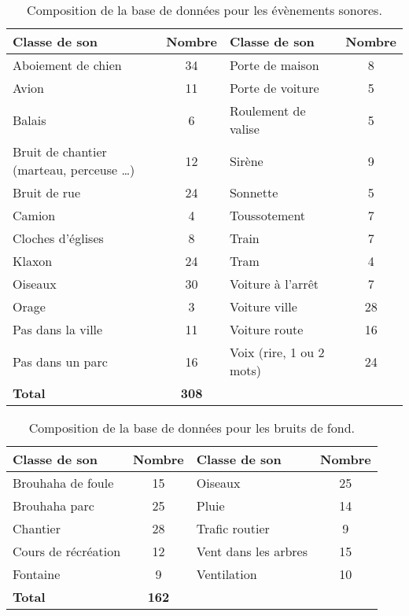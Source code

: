 \begin{table}[h]
\caption{Composition de la base de données pour les évènements sonores.}
\centering
\begin{tabular}{m{5cm} c |m{5cm} c}
\hline
\toprule
\textbf{Classe de son} & \textbf{Nombre} & \textbf{Classe de son} & \textbf{Nombre} \\
\midrule
Aboiement de chien & 34 & Porte de maison & 8\\ 
\rowcolor[HTML]{C0C0C0}
Avion & 11 &  Porte de voiture & 5\\ 
Balais & 6 & Roulement de valise & 5\\ 
\rowcolor[HTML]{C0C0C0}
Bruit de chantier (marteau, perceuse \dots) & 12 &  Sirène & 9 \\ 
Bruit de rue & 24 & Sonnette & 5\\ 
\rowcolor[HTML]{C0C0C0}
Camion & 4 & Toussotement & 7 \\ 
Cloches d'églises & 8 & Train & 7\\
\rowcolor[HTML]{C0C0C0}
Klaxon & 24 &  Tram & 4 \\ 
Oiseaux & 30 &  Voiture à l'arrêt & 7\\ 
\rowcolor[HTML]{C0C0C0}
Orage & 3 &  Voiture ville & 28\\ 
Pas dans la ville & 11 & Voiture route & 16 \\
\rowcolor[HTML]{C0C0C0}
Pas dans un parc & 16 &  Voix (rire, 1 ou 2 mots) & 24 \\ 
\textbf{Total} & \textbf{308}\\
\bottomrule
\end{tabular}
\label{tab:dataBaseEv}
\end{table}



\begin{table}[h]
\caption{Composition de la base de données pour les bruits de fond.}
\centering
\begin{tabular}{m{5cm} c |m{5cm} c}
\toprule
\textbf{Classe de son} & \textbf{Nombre} & \textbf{Classe de son} & \textbf{Nombre} \\ \midrule
Brouhaha de foule & 15 & Oiseaux & 25 \\ 
\rowcolor[HTML]{C0C0C0}
Brouhaha parc & 25 & Pluie & 14 \\
Chantier & 28 & Trafic routier & 9 \\ 
\rowcolor[HTML]{C0C0C0}
Cours de récréation & 12 & Vent dans les arbres & 15 \\ 
Fontaine & 9 & Ventilation & 10 \\ 
\rowcolor[HTML]{C0C0C0}
\textbf{Total} & \textbf{162} & & \\
\bottomrule
\end{tabular}
\label{tab:dataBaseBcg}
\end{table}
